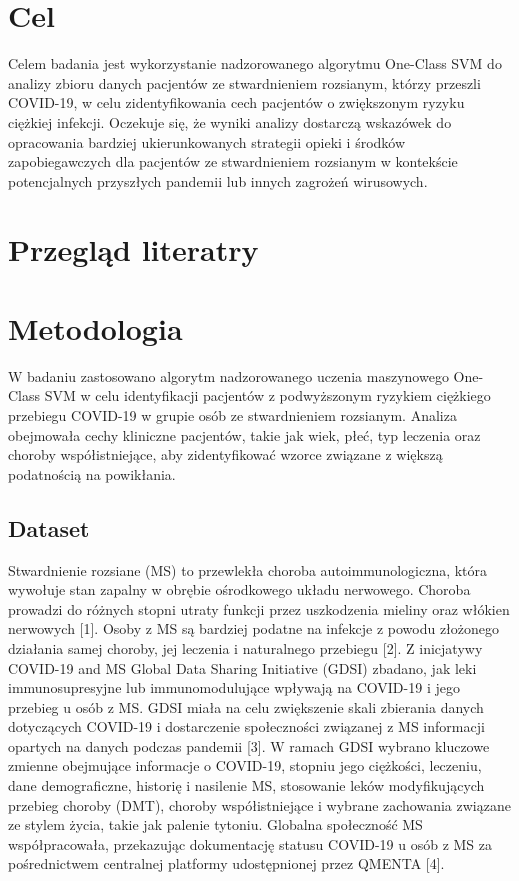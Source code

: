 \documentclass[a4paper,fleqn]{cas-dc}
\begin{document}
\section{Cel}
Celem badania jest wykorzystanie nadzorowanego algorytmu One-Class SVM do analizy zbioru danych pacjentów ze stwardnieniem rozsianym, którzy przeszli COVID-19, w celu zidentyfikowania cech pacjentów o zwiększonym ryzyku ciężkiej infekcji. Oczekuje się, że wyniki analizy dostarczą wskazówek do opracowania bardziej ukierunkowanych strategii opieki i środków zapobiegawczych dla pacjentów ze stwardnieniem rozsianym w kontekście potencjalnych przyszłych pandemii lub innych zagrożeń wirusowych.

\section{Przegląd literatry}

\section{Metodologia}
W badaniu zastosowano algorytm nadzorowanego uczenia maszynowego One-Class SVM w celu identyfikacji pacjentów z podwyższonym ryzykiem ciężkiego przebiegu COVID-19 w grupie osób ze stwardnieniem rozsianym. Analiza obejmowała cechy kliniczne pacjentów, takie jak wiek, płeć, typ leczenia oraz choroby współistniejące, aby zidentyfikować wzorce związane z większą podatnością na powikłania.

\subsection{Dataset}
Stwardnienie rozsiane (MS) to przewlekła choroba autoimmunologiczna, która wywołuje stan zapalny w obrębie ośrodkowego układu nerwowego. Choroba prowadzi do różnych stopni utraty funkcji przez uszkodzenia mieliny oraz włókien nerwowych [1]. Osoby z MS są bardziej podatne na infekcje z powodu złożonego działania samej choroby, jej leczenia i naturalnego przebiegu [2]. Z inicjatywy COVID-19 and MS Global Data Sharing Initiative (GDSI) zbadano, jak leki immunosupresyjne lub immunomodulujące wpływają na COVID-19 i jego przebieg u osób z MS. GDSI miała na celu zwiększenie skali zbierania danych dotyczących COVID-19 i dostarczenie społeczności związanej z MS informacji opartych na danych podczas pandemii [3]. W ramach GDSI wybrano kluczowe zmienne obejmujące informacje o COVID-19, stopniu jego ciężkości, leczeniu, dane demograficzne, historię i nasilenie MS, stosowanie leków modyfikujących przebieg choroby (DMT), choroby współistniejące i wybrane zachowania związane ze stylem życia, takie jak palenie tytoniu. Globalna społeczność MS współpracowała, przekazując dokumentację statusu COVID-19 u osób z MS za pośrednictwem centralnej platformy udostępnionej przez QMENTA [4].
\end{document}
